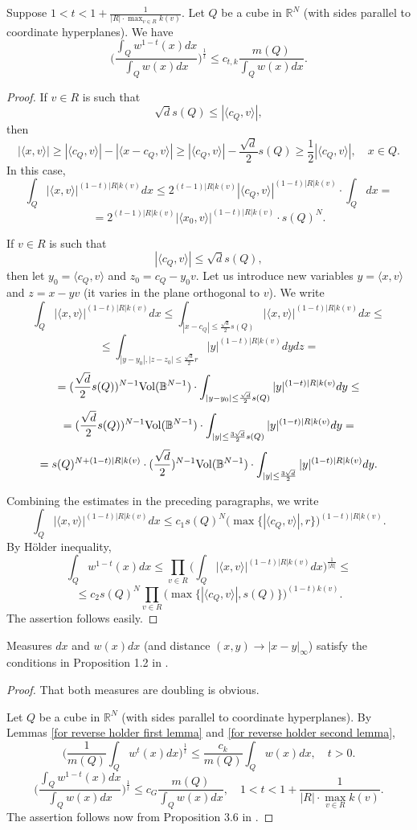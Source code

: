 \documentclass{amsart}
\begin{document}
\begin{lemma}\label{for reverse holder second lemma} Suppose $1<t<1+\frac1{|R|\cdot\max_{v\in R}k(v)}.$ Let $Q$ be a cube in $\mathbb{R}^N$ (with sides parallel to coordinate hyperplanes). We have
$$\Big(\frac{\int_Qw^{1-t}(x)dx}{\int_Qw(x)dx}\Big)^{\frac1t}\leq c_{t,k} \frac{m(Q)}{\int_Qw(x)dx}.$$
\end{lemma}
\begin{proof} If $v\in R$ is such that
$$\sqrt{d}s(Q)\leq |\langle c_Q,v\rangle|,$$
then
$$|\langle x,v\rangle|\geq |\langle c_Q,v\rangle|-|\langle x-c_Q,v\rangle|\geq |\langle c_Q,v\rangle|-\frac{\sqrt{d}}{2}s(Q)\geq \frac12|\langle c_Q,v\rangle|,\quad x\in Q.$$
In this case,
$$\int_Q|\langle x,v\rangle|^{(1-t)|R|k(v)}dx\leq 2^{(t-1)|R|k(v)}|\langle c_Q,v\rangle|^{(1-t)|R|k(v)}\cdot\int_Qdx=$$
$$=2^{(t-1)|R|k(v)}|\langle x_0,v\rangle|^{(1-t)|R|k(v)}\cdot s(Q)^N.$$

If $v\in R$ is such that
$$|\langle c_Q,v\rangle|\leq \sqrt{d}s(Q),$$
then let $y_0=\langle c_Q,v\rangle$ and $z_0=c_Q-y_0v.$ Let us introduce new variables $y=\langle x,v\rangle$ and $z=x-yv$ (it varies in the plane orthogonal to $v$). We write
$$\int_Q|\langle x,v\rangle|^{(1-t)|R|k(v)}dx\leq\int_{|x-c_Q|\leq\frac{\sqrt{d}}{2}s(Q)}|\langle x,v\rangle|^{(1-t)|R|k(v)}dx\leq$$
$$\leq \int_{|y-y_0|,|z-z_0|\leq \frac{\sqrt{d}}{2}r}|y|^{(1-t)|R|k(v)}dydz=$$
$$=(\frac{\sqrt{d}}{2}s(Q))^{N-1}{\rm Vol}(\mathbb{B}^{N-1})\cdot\int_{|y-y_0|\leq \frac{\sqrt{d}}{2}s(Q)}|y|^{(1-t)|R|k(v)}dy\leq$$
$$=(\frac{\sqrt{d}}{2}s(Q))^{N-1}{\rm Vol}(\mathbb{B}^{N-1})\cdot\int_{|y|\leq \frac{3\sqrt{d}}{2}s(Q)}|y|^{(1-t)|R|k(v)}dy=$$
$$=s(Q)^{N+(1-t)|R|k(v)}\cdot (\frac{\sqrt{d}}{2})^{N-1}{\rm Vol}(\mathbb{B}^{N-1})\cdot\int_{|y|\leq \frac{3\sqrt{d}}{2}}|y|^{(1-t)|R|k(v)}dy.$$

Combining the estimates in the preceding paragraphs, we write
$$\int_Q|\langle x,v\rangle|^{(1-t)|R|k(v)}dx\leq c_1s(Q)^N\big(\max\{|\langle c_Q,v\rangle|,r\}\big)^{(1-t)|R|k(v)}.$$
By H\"older inequality,
$$\int_Qw^{1-t}(x)dx\leq \prod_{v\in R}\Big(\int_Q|\langle x,v\rangle|^{(1-t)|R|k(v)}dx\Big)^{\frac1{|R|}}\leq$$
$$\leq c_2s(Q)^N\prod_{v\in R}\big(\max\{|\langle c_Q,v\rangle|,s(Q)\}\big)^{(1-t)k(v)}.$$
The assertion follows easily.
\end{proof}

\begin{lemma}\label{hytonen verification lemma} Measures $dx$ and $w(x)dx$ (and distance $(x,y)\to |x-y|_{\infty}$) satisfy the conditions in Proposition 1.2 in \cite{Hytonen-new}.
\end{lemma}
\begin{proof} That both measures are doubling is obvious.

Let $Q$ be a cube in $\mathbb{R}^N$ (with sides parallel to coordinate hyperplanes). By Lemmas \ref{for reverse holder first lemma} and \ref{for reverse holder second lemma},
$$\Big(\frac1{m(Q)}\int_Qw^t(x)dx\Big)^{\frac1t}\leq\frac{c_k}{m(Q)}\int_Qw(x)dx,\quad t>0.$$
$$\Big(\frac{\int_Qw^{1-t}(x)dx}{\int_Qw(x)dx}\Big)^{\frac1t}\leq c_G \frac{m(Q)}{\int_Qw(x)dx},\quad 1<t<1+\frac1{|R|\cdot\max_{v\in R}k(v)}.$$
The assertion follows now from Proposition 3.6 in \cite{Hytonen-new}.
\end{proof}
\end{document}
